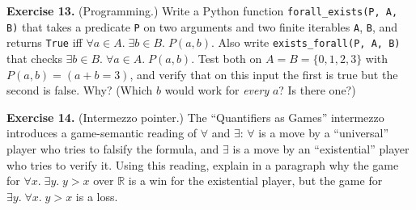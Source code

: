 \documentclass[11pt]{article}
\begin{document}
\textbf{Exercise 13.}\label{ex:m4:13} (Programming.) Write a Python function \texttt{forall\_exists(P, A, B)} that takes a predicate \texttt{P} on two arguments and two finite iterables \texttt{A}, \texttt{B}, and returns \texttt{True} iff $\forall a \in A.\; \exists b \in B.\; P(a, b)$. Also write \texttt{exists\_forall(P, A, B)} that checks $\exists b \in B.\; \forall a \in A.\; P(a, b)$. Test both on $A = B = \{0, 1, 2, 3\}$ with $P(a, b) = (a + b = 3)$, and verify that on this input the first is true but the second is false. Why? (Which $b$ would work for \emph{every} $a$? Is there one?)

\bigskip
\textbf{Exercise 14.}\label{ex:m4:14} (Intermezzo pointer.) The ``Quantifiers as Games'' intermezzo introduces a game-semantic reading of $\forall$ and $\exists$: $\forall$ is a move by a ``universal'' player who tries to falsify the formula, and $\exists$ is a move by an ``existential'' player who tries to verify it. Using this reading, explain in a paragraph why the game for $\forall x.\;\exists y.\; y > x$ over $\mathbb{R}$ is a win for the existential player, but the game for $\exists y.\;\forall x.\; y > x$ is a loss.
\end{document}
